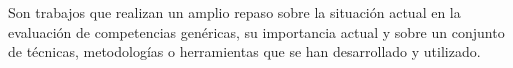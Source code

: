 
\cite{Velasco:2012,Achcaoucaou:2012,BenoCsap:2012}


Son trabajos que realizan un amplio repaso sobre la situación actual en la evaluación de competencias genéricas, su importancia actual y sobre un conjunto de técnicas, metodologías o herramientas que se han desarrollado y utilizado.






